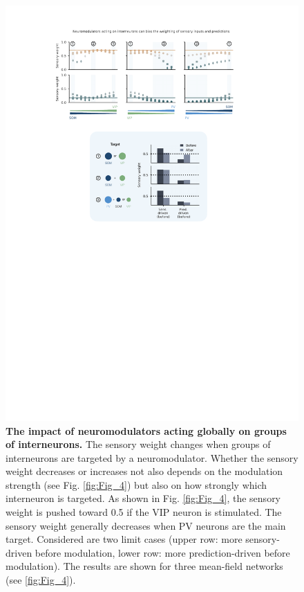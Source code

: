 \documentclass[10pt,a4paper]{article}
\begin{document}
\begin{figure}[!h]
	\centering
    \includegraphics{../results/figures/final/Fig_4_S1.pdf}%
\caption{\footnotesize{\bf The impact of neuromodulators acting globally on groups of interneurons. \newline}  
The sensory weight changes when groups of interneurons are targeted by a neuromodulator. Whether the sensory weight decreases or increases not also depends on the modulation strength (see Fig. \ref{fig:Fig_4}) but also on how strongly which interneuron is targeted.  As shown in Fig. \ref{fig:Fig_4}, the sensory weight is pushed toward 0.5 if the VIP neuron is stimulated. The sensory weight generally decreases when PV neurons are the main target. Considered are two limit cases (upper row: more sensory-driven before modulation, lower row: more prediction-driven before modulation). The results are shown for three mean-field networks (see \ref{fig:Fig_4}).
}
\label{fig:Fig_4_S1}
\end{figure}
\end{document}

